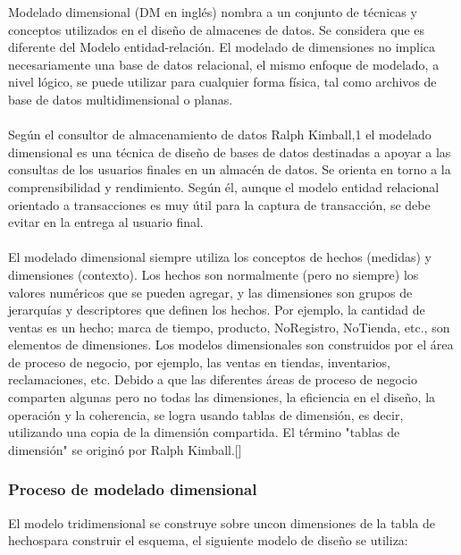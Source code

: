 \documentclass[11pt,a4paper]{article}
\begin{document}
		Modelado dimensional (DM en inglés) nombra a un conjunto de técnicas y conceptos utilizados en el diseño de almacenes de datos. Se considera que es diferente del Modelo entidad-relación. El modelado de dimensiones no implica necesariamente una base de datos relacional, el mismo enfoque de modelado, a nivel lógico, se puede utilizar para cualquier forma física, tal como archivos de base de datos multidimensional o planas. \\
		\\
		Según el consultor de almacenamiento de datos Ralph Kimball,1 el modelado dimensional es una técnica de diseño de bases de datos destinadas a apoyar a las consultas de los usuarios finales en un almacén de datos. Se orienta en torno a la comprensibilidad y rendimiento. Según él, aunque el modelo entidad relacional orientado a transacciones es muy útil para la captura de transacción, se debe evitar en la entrega al usuario final.\\
		\\
		El modelado dimensional siempre utiliza los conceptos de hechos (medidas) y dimensiones (contexto). Los hechos son normalmente (pero no siempre) los valores numéricos que se pueden agregar, y las dimensiones son grupos de jerarquías y descriptores que definen los hechos. Por ejemplo, la cantidad de ventas es un hecho; marca de tiempo, producto, NoRegistro, NoTienda, etc., son elementos de dimensiones. Los modelos dimensionales son construidos por el área de proceso de negocio, por ejemplo, las ventas en tiendas, inventarios, reclamaciones, etc. Debido a que las diferentes áreas de proceso de negocio comparten algunas pero no todas las dimensiones, la eficiencia en el diseño, la operación y la coherencia, se logra usando tablas de dimensión, es decir, utilizando una copia de la dimensión compartida. El término "tablas de dimensión" se originó por Ralph Kimball.[\cite{ramos2016data}]
		
		\subsubsection{Proceso de modelado dimensional}
		
		El modelo tridimensional se construye sobre uncon dimensiones de la tabla de hechospara construir el esquema, el siguiente modelo de diseño se utiliza:
		
\end{document}

